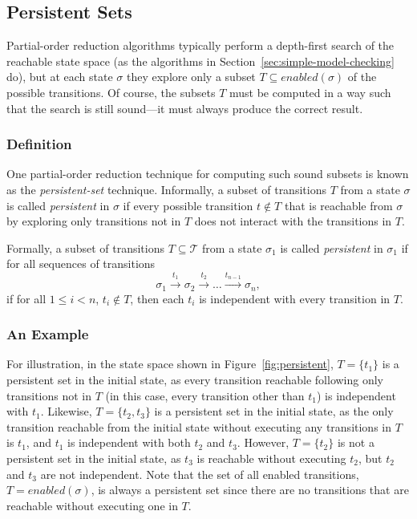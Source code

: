 \documentclass[12pt,a4paper,twoside,openright]{report}
\begin{document}
\subsection{Persistent Sets}
\label{sec:persistent}

Partial-order reduction algorithms typically 
perform a depth-first
search of the reachable state space
(as the algorithms in
Section~\ref{sec:simple-model-checking} do), but at each
state $\sigma$ they explore only a subset
$T \subseteq \textit{enabled}(\sigma)$
of the possible transitions.
Of course, the subsets
$T$ must be computed in a way such that the search
is still sound---it must always
produce the correct result.

\subsubsection{Definition}
One partial-order reduction technique for
computing such sound subsets is known
as the \emph{persistent-set} technique. Informally,
a subset of transitions $T$ from a state $\sigma$
is called \emph{persistent} in $\sigma$ if every
possible transition $t \not \in T$ that is reachable
from $\sigma$ by exploring only transitions not in
$T$ does not interact with the transitions
in $T$.

Formally, a subset of transitions $T \subseteq \mathcal{T}$
from a state $\sigma_1$
is called \emph{persistent} in $\sigma_1$ if
for all sequences of transitions
\[
	\sigma_1 \xrightarrow{\ t_1\ } \sigma_2 \xrightarrow{\ t_2\ } \ldots
	\xrightarrow{t_{n-1}} \sigma_n,
\]
if for all $1 \leq i < n$, $t_i \not \in T$, then each $t_i$ is
independent with every transition in $T$.

\subsubsection{An Example}
For illustration, in the state space shown in
Figure~\ref{fig:persistent}, $T = \{t_1\}$ is
a persistent set in the initial state, as every
transition reachable following only transitions
not in $T$ (in this case, every transition other
than $t_1$) is independent with $t_1$.
Likewise, $T = \{t_2, t_3\}$ is
a persistent set in the initial state, as the
only transition reachable from the initial state
without executing any transitions in $T$ is $t_1$,
and $t_1$ is independent with both $t_2$ and $t_3$.
However, $T = \{t_2\}$ is not a persistent set in the
initial state, as $t_3$ is reachable without
executing $t_2$, but $t_2$ and $t_3$ are not independent.
Note that the set of all enabled transitions,
$T = \textit{enabled}(\sigma)$, is always a
persistent set since there are no transitions
that are reachable without executing one in $T$.
\end{document}
